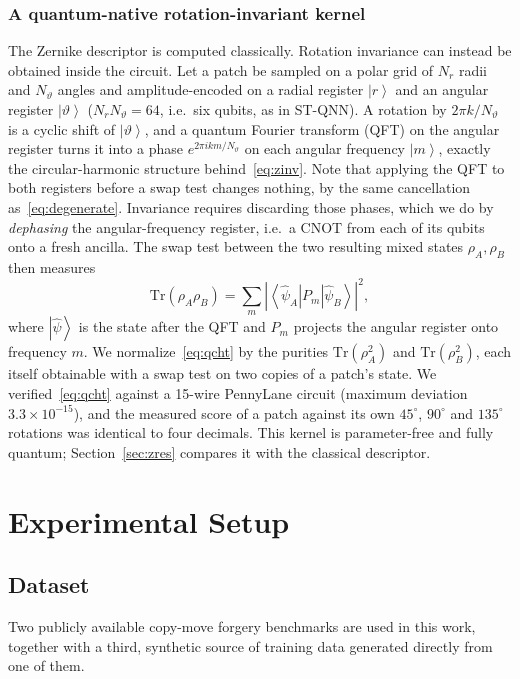 \documentclass[conference]{IEEEtran}
\newcommand{\ket}[1]{\left|#1\right\rangle}
\newcommand{\bra}[1]{\left\langle#1\right|}
\begin{document}
\subsubsection{A quantum-native rotation-invariant kernel}\label{sec:qcht}
The Zernike descriptor is computed classically. Rotation invariance can instead be obtained inside the circuit. Let a patch be sampled on a polar grid of $N_r$ radii and $N_\vartheta$ angles and amplitude-encoded on a radial register $\ket{r}$ and an angular register $\ket{\vartheta}$ ($N_rN_\vartheta = 64$, i.e.\ six qubits, as in ST-QNN). A rotation by $2\pi k/N_\vartheta$ is a cyclic shift of $\ket{\vartheta}$, and a quantum Fourier transform (QFT) on the angular register turns it into a phase $e^{2\pi i km/N_\vartheta}$ on each angular frequency $\ket{m}$, exactly the circular-harmonic structure behind~\eqref{eq:zinv}. Note that applying the QFT to both registers before a swap test changes nothing, by the same cancellation as~\eqref{eq:degenerate}. Invariance requires discarding those phases, which we do by \emph{dephasing} the angular-frequency register, i.e.\ a CNOT from each of its qubits onto a fresh ancilla. The swap test between the two resulting mixed states $\rho_A,\rho_B$ then measures
\begin{equation}
\mathrm{Tr}(\rho_A\rho_B) = \sum_m \left|\bra{\hat\psi_A}P_m\ket{\hat\psi_B}\right|^2,
\label{eq:qcht}
\end{equation}
where $\ket{\hat\psi}$ is the state after the QFT and $P_m$ projects the angular register onto frequency $m$. We normalize~\eqref{eq:qcht} by the purities $\mathrm{Tr}(\rho_A^2)$ and $\mathrm{Tr}(\rho_B^2)$, each itself obtainable with a swap test on two copies of a patch's state. We verified~\eqref{eq:qcht} against a 15-wire PennyLane circuit (maximum deviation $3.3\times10^{-15}$), and the measured score of a patch against its own $45^\circ$, $90^\circ$ and $135^\circ$ rotations was identical to four decimals. This kernel is parameter-free and fully quantum; Section~\ref{sec:zres} compares it with the classical descriptor.

\section{Experimental Setup}\label{sec:setup}

\subsection{Dataset}
Two publicly available copy-move forgery benchmarks are used in this work, together with a third, synthetic source of training data generated directly from one of them.
\end{document}
